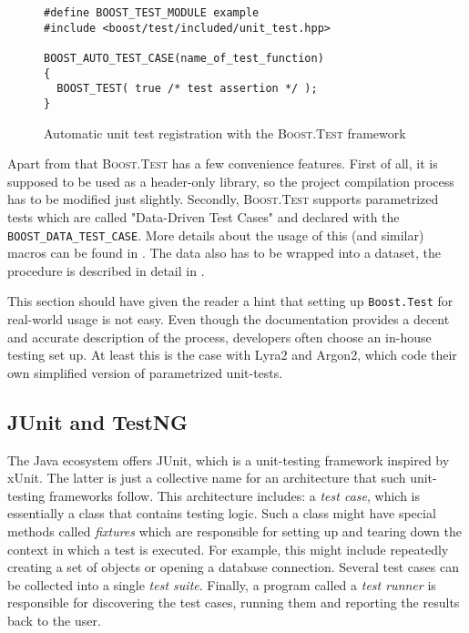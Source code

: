 \begin{figure}
\centering
\begin{verbatim}
#define BOOST_TEST_MODULE example
#include <boost/test/included/unit_test.hpp>

BOOST_AUTO_TEST_CASE(name_of_test_function)
{
  BOOST_TEST( true /* test assertion */ );
}
  \end{verbatim}
  \caption{Automatic unit test registration with the \textsc{Boost.Test} framework}
  \label{figure:boost-auto-test-case}
  \end{figure}

Apart from that \textsc{Boost.Test} has a few convenience features. First of all, it is supposed to be used as a header-only library, so the project compilation process has to be modified just slightly. Secondly, \textsc{Boost.Test} supports parametrized tests which are called "Data-Driven Test Cases" and declared with the \texttt{BOOST_DATA_TEST_CASE}. More details about the usage of this (and similar) macros can be found in \cite{boost:2017:test-docs-data-macro}. The data also has to be wrapped into a dataset, the procedure is described in detail in \cite{boost:2017:test-docs-dataset}.

This section should have given the reader a hint that setting up \texttt{Boost.Test} for real-world usage is not easy. Even though the documentation provides a decent and accurate description of the process, developers often choose an in-house testing set up. At least this is the case with Lyra2 and Argon2, which code their own simplified version of parametrized unit-tests.

\subsection{JUnit and TestNG}
\label{sec:unit-junit-testng}

The Java ecosystem offers JUnit, which is a unit-testing framework inspired by xUnit. The latter is just a collective name for an architecture that such unit-testing frameworks follow. This architecture includes: a \emph{test case}, which is essentially a class that contains testing logic. Such a class might have special methods called \emph{fixtures} which are responsible for setting up and tearing down the context in which a test is executed. For example, this might include repeatedly creating a set of objects or opening a database connection. Several test cases can be collected into a single \emph{test suite}. Finally, a program called a \emph{test runner} is responsible for discovering the test cases, running them and reporting the results back to the user.

